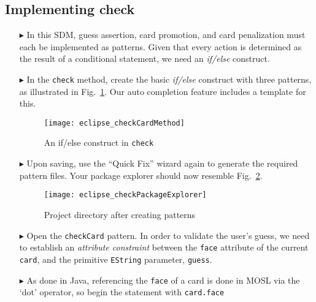 \newpage
\hypertarget{checkCard tex}{}
\subsection{Implementing check}
\texHeader
 
\begin{itemize}
   
\item[$\blacktriangleright$] In this SDM, guess assertion, card promotion, and card penalization must each be implemented as patterns. Given that every
action is determined as the result of a conditional statement, we need an \emph{if/else} construct.

\item[$\blacktriangleright$] In the \texttt{check} method, create the basic \emph{if/else} construct with three patterns, as illustrated in
Fig.~\ref{fig:checkDec}. Our auto completion feature includes a template for this.

\vspace{0.5cm}

\begin{figure}[htbp]
\begin{center}
  \texttt{[image: eclipse\_checkCardMethod]}
  \caption{An if/else construct in \texttt{check}}
  \label{fig:checkDec}
\end{center}
\end{figure} 

\item[$\blacktriangleright$] Upon saving, use the ``Quick Fix'' wizard again to generate the required pattern files. Your package explorer should now resemble
Fig.~\ref{fig:checkPatternsExplorer}.

\begin{figure}[htbp]
\begin{center}
  \texttt{[image: eclipse\_checkPackageExplorer]}
  \caption{Project directory after creating patterns}
  \label{fig:checkPatternsExplorer}
\end{center}
\end{figure} 

\item[$\blacktriangleright$] Open the \texttt{checkCard} pattern. In order to validate the user's guess, we need to establish an \emph{attribute constraint}
between the \texttt{face} attribute of the current \texttt{card}, and the primitive \texttt{EString} parameter, \texttt{guess}. 

\item[$\blacktriangleright$] As done in Java, referencing the \texttt{face} of a card is done in MOSL via the `dot' operator, so begin the statement with
\texttt{card.face}


\end{itemize}
